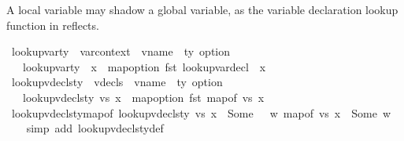 \begin{isabellebody}
\begin{isamarkuptext}%
A local variable may shadow a global variable, as the variable declaration lookup function in
  reflects.%
\end{isamarkuptext}\isamarkuptrue%
\isamarkupfalse%
\ lookup{\isacharunderscore}{\kern0pt}var{\isacharunderscore}{\kern0pt}ty\ {\isacharcolon}{\kern0pt}{\isacharcolon}{\kern0pt}\ {\isachardoublequoteopen}var{\isacharunderscore}{\kern0pt}context\ {\isasymRightarrow}\ vname\ {\isasymRightarrow}\ ty\ option{\isachardoublequoteclose}\isanewline
\ \ \ {\isachardoublequoteopen}lookup{\isacharunderscore}{\kern0pt}var{\isacharunderscore}{\kern0pt}ty\ {\isasymLambda}\ x\ {\isacharequal}{\kern0pt}\ map{\isacharunderscore}{\kern0pt}option\ fst\ {\isacharparenleft}{\kern0pt}lookup{\isacharunderscore}{\kern0pt}var{\isacharunderscore}{\kern0pt}decl\ {\isasymLambda}\ x{\isacharparenright}{\kern0pt}{\isachardoublequoteclose}\isanewline
\isanewline
{}\isamarkupfalse%
\ lookup{\isacharunderscore}{\kern0pt}vdecls{\isacharunderscore}{\kern0pt}ty\ {\isacharcolon}{\kern0pt}{\isacharcolon}{\kern0pt}\ {\isachardoublequoteopen}vdecls\ {\isasymRightarrow}\ vname\ {\isasymRightarrow}\ ty\ option{\isachardoublequoteclose}\isanewline
\ \ \ {\isachardoublequoteopen}lookup{\isacharunderscore}{\kern0pt}vdecls{\isacharunderscore}{\kern0pt}ty\ vs\ x\ {\isacharequal}{\kern0pt}\ map{\isacharunderscore}{\kern0pt}option\ fst\ {\isacharparenleft}{\kern0pt}map{\isacharunderscore}{\kern0pt}of\ vs\ x{\isacharparenright}{\kern0pt}{\isachardoublequoteclose}\isanewline
\isanewline
{}\isamarkupfalse%
\ lookup{\isacharunderscore}{\kern0pt}vdecls{\isacharunderscore}{\kern0pt}ty{\isacharunderscore}{\kern0pt}map{\isacharunderscore}{\kern0pt}of{\isacharcolon}{\kern0pt}\ {\isachardoublequoteopen}lookup{\isacharunderscore}{\kern0pt}vdecls{\isacharunderscore}{\kern0pt}ty\ vs\ x\ {\isacharequal}{\kern0pt}\ Some\ {\isasymtau}\ {\isasymLongrightarrow}\ {\isasymexists}w{\isachardot}{\kern0pt}\ map{\isacharunderscore}{\kern0pt}of\ vs\ x\ {\isacharequal}{\kern0pt}\ Some\ {\isacharparenleft}{\kern0pt}{\isasymtau}{\isacharcomma}{\kern0pt}w{\isacharparenright}{\kern0pt}{\isachardoublequoteclose}\isanewline
%
\isadelimproof
\ \ %
\endisadelimproof
%
\isatagproof
{}\isamarkupfalse%
\ {\isacharparenleft}{\kern0pt}simp\ add{\isacharcolon}{\kern0pt}\ lookup{\isacharunderscore}{\kern0pt}vdecls{\isacharunderscore}{\kern0pt}ty{\isacharunderscore}{\kern0pt}def{\isacharparenright}{\kern0pt}%

\end{isabellebody}
